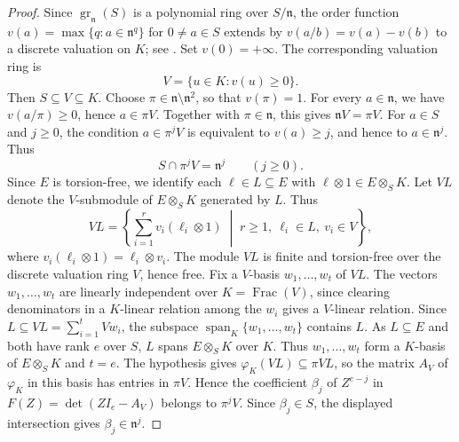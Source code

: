 \documentclass[11pt,reqno]{amsart}
\numberwithin{equation}{section}
\theoremstyle{definition}
\begin{document}
\begin{proof}
Since $\operatorname{gr}_{\mathfrak n}(S)$ is a polynomial ring
over $S/\mathfrak n$, the order function
$v(a)=\max\{q:a\in\mathfrak n^q\}$ for $0\ne a\in S$
extends by $v(a/b)=v(a)-v(b)$ to a discrete valuation on $K$;
see \cite[Theorem~6.7.9]{HunekeSwanson2006}.
Set $v(0)=+\infty$. The corresponding valuation ring is
\[
 V=\{u\in K:v(u)\ge0\}.
\]
Then $S\subseteq V\subseteq K$.
Choose $\pi\in\mathfrak n\setminus\mathfrak n^2$, so that $v(\pi)=1$.
For every $a\in\mathfrak n$, we have $v(a/\pi)\ge0$, hence
$a\in\pi V$. Together with $\pi\in\mathfrak n$, this gives
$\mathfrak nV=\pi V$. For $a\in S$ and $j\ge0$, the condition
$a\in\pi^jV$ is equivalent to $v(a)\ge j$, and hence to
$a\in\mathfrak n^j$. Thus
\[
 S\cap\pi^jV=\mathfrak n^j\qquad(j\ge0).
\]
Since $E$ is torsion-free, we identify each $\ell\in L\subseteq E$
with $\ell\otimes 1\in E\otimes_S K$. Let $VL$ denote the
$V$-submodule of $E\otimes_S K$ generated by $L$. Thus
\[
 VL=\left\{\sum_{i=1}^{r} v_i(\ell_i\otimes 1)
      \;\middle|\; r\ge1,\ \ell_i\in L,\ v_i\in V\right\},
\]
where $v_i(\ell_i\otimes 1)=\ell_i\otimes v_i$.
The module $VL$ is finite and torsion-free over
the discrete valuation ring $V$, hence free. Fix a $V$-basis $w_1,\ldots,w_t$ of $VL$.
The vectors $w_1,\ldots,w_t$ are linearly independent over
$K=\operatorname{Frac}(V)$, since clearing denominators in a
$K$-linear relation among the $w_i$ gives a $V$-linear relation.
Since $L\subseteq VL=\sum_{i=1}^t Vw_i$, the subspace
$\operatorname{span}_K\{w_1,\ldots,w_t\}$ contains $L$.
As $L\subseteq E$ and both have rank $e$ over $S$, $L$ spans
$E\otimes_S K$ over $K$. Thus $w_1,\ldots,w_t$ form a $K$-basis
of $E\otimes_S K$ and $t=e$. The hypothesis gives $\varphi_K(VL)\subseteq\pi VL$,
so the matrix $A_V$ of $\varphi_K$ in this basis has entries in $\pi V$.
Hence the coefficient $\beta_j$ of $Z^{e-j}$ in
$F(Z)=\det(ZI_e-A_V)$ belongs to $\pi^jV$. Since $\beta_j\in S$,
the displayed intersection gives $\beta_j\in\mathfrak n^j$.
\end{proof}
\end{document}
